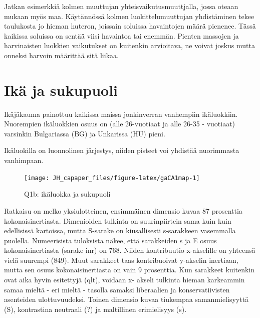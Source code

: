 \documentclass[
  finnish,
]{book}
\begin{document}
Jatkan esimerkkiä kolmen muuttujan yhteisvaikutusmuuttjalla, jossa oteaan mukaan
myös maa. Käytännössä kolmen luokittelumuuttujan yhdistäminen tekee taulukosta
jo hieman huteron, joissain soluissa havaintojen määrä pienenee. Tässä kaikissa
soluissa on sentää viisi havaintoa tai enemmän. Pienten massojen ja harvinaisten
luokkien vaikutukset on kuitenkin arvioitava, ne voivat joskus mutta onneksi
harvoin määrittää sitä liikaa.

\hypertarget{ikuxe4-ja-sukupuoli}{%
\section{Ikä ja sukupuoli}\label{ikuxe4-ja-sukupuoli}}

Ikäjäkauma painottuu kaikissa maissa jonkinverran vanhempiin ikäluokkiin.
Nuorempien ikäluokkien osuus on (alle 26-vuotiaat ja alle 26-35 - vuotiaat)
varsinkin Bulgariassa (BG) ja Unkarissa (HU) pieni.

Ikäluokilla on luonnolinen järjestys, niiden pisteet voi yhdistää nuorimmasta
vanhimpaan.

\begin{figure}

{\centering \texttt{[image: JH\_capaper\_files/figure-latex/gaCA1map-1]} 

}

\caption{Q1b: ikäluokka ja sukupuoli}\label{fig:gaCA1map}
\end{figure}

Ratkaisu on melko yksiulotteinen, ensimmäinen dimensio kuvaa 87 prosenttia
kokonaisinertiasta. Dimenioiden tulkinta on suurinpiirtein sama kuin kuin
edellisissä kartoissa, mutta S-sarake on kiusallisesti s-sarakkeen vasemmalla
puolella. Numeerisista tuloksista näkee, että sarakkeiden s ja E osuus
kokonaisinertiasta (sarake inr) on 768. Niiden kontribuutio x-akselille on
yhteensä vielä suurempi (849). Muut sarakkeet taas kontribuoivat y-akselin
inertiaan, mutta sen osuus kokonaisinertiasta on vain 9 prosenttia. Kun sarakkeet
kuitenkin ovat aika hyvin esitettyjä (qlt), voidaan x- akseli tulkinta hieman
karkeammin samaa mieltä - eri mieltä - tasolla samaksi liberaalien ja
konservatiivisten asenteiden ulottuvuudeksi. Toinen dimensio kuvaa tiukempaa
samanmielisyyttä (S), kontrastina neutraali (?) ja maltillinen erimielisyys (s).
\end{document}
